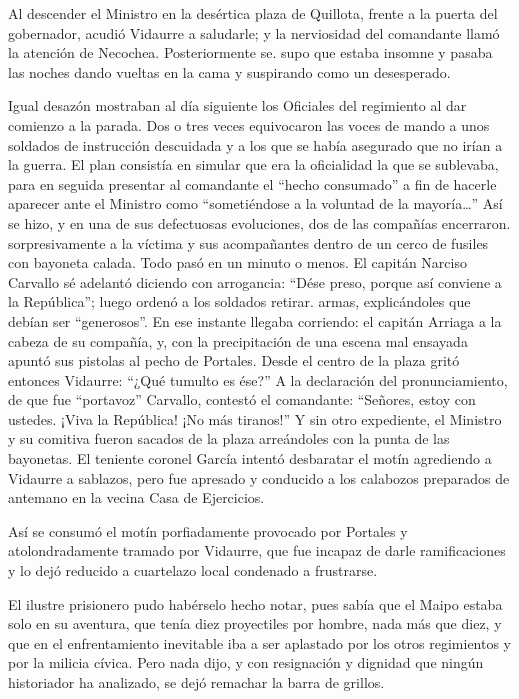 \documentclass[10pt,twoside,openright]{memoir}
\begin{document}
Al descender el Ministro en la desértica plaza de Quillota, frente a la
puerta del gobernador, acudió Vidaurre a saludarle; y la nerviosidad del
comandante llamó la atención de Necochea. Posteriormente se. supo que
estaba insomne y pasaba las noches dando vueltas en la cama y suspirando
como un desesperado.

Igual desazón mostraban al día siguiente los Oficiales del regimiento al
dar comienzo a la parada. Dos o tres veces equivocaron las voces de
mando a unos soldados de instrucción descuidada y a los que se había
asegurado que no irían a la guerra. El plan consistía en simular que era
la oficialidad la que se sublevaba, para en seguida presentar al
comandante el ``hecho consumado'' a fin de hacerle aparecer ante el
Ministro como ``sometiéndose a la voluntad de la mayoría\ldots'' Así se hizo,
y en una de sus defectuosas evoluciones, dos de las compañías
encerraron. sorpresivamente a la víctima y sus acompañantes dentro de un
cerco de fusiles con bayoneta calada. Todo pasó en un minuto o menos. El
capitán Narciso Carvallo sé adelantó diciendo con arrogancia: ``Dése
preso, porque así conviene a la República''; luego ordenó a los soldados
retirar. armas, explicándoles que debían ser ``generosos''. En ese
instante llegaba corriendo: el capitán Arriaga a la cabeza de su
compañía, y, con la precipitación de una escena mal ensayada apuntó sus
pistolas al pecho de Portales. Desde el centro de la plaza gritó
entonces Vidaurre: ``¿Qué tumulto es ése?'' A la declaración del
pronunciamiento, de que fue ``portavoz'' Carvallo, contestó el comandante:
``Señores, estoy con ustedes. ¡Viva la República! ¡No más tiranos!'' Y sin
otro expediente, el Ministro y su comitiva fueron sacados de la plaza
arreándoles con la punta de las bayonetas. El teniente coronel García
intentó desbaratar el motín agrediendo a Vidaurre a sablazos, pero fue
apresado y conducido a los calabozos preparados de antemano en la vecina
Casa de Ejercicios.

Así se consumó el motín porfiadamente provocado por Portales y
atolondradamente tramado por Vidaurre, que fue incapaz de darle
ramificaciones y lo dejó reducido a cuartelazo local condenado a
frustrarse.

El ilustre prisionero pudo habérselo hecho notar, pues sabía que el
Maipo estaba solo en su aventura, que tenía diez proyectiles por hombre,
nada más que diez, y que en el enfrentamiento inevitable iba a ser
aplastado por los otros regimientos y por la milicia cívica. Pero nada
dijo, y con resignación y dignidad que ningún historiador ha analizado,
se dejó remachar la barra de grillos.
\end{document}
